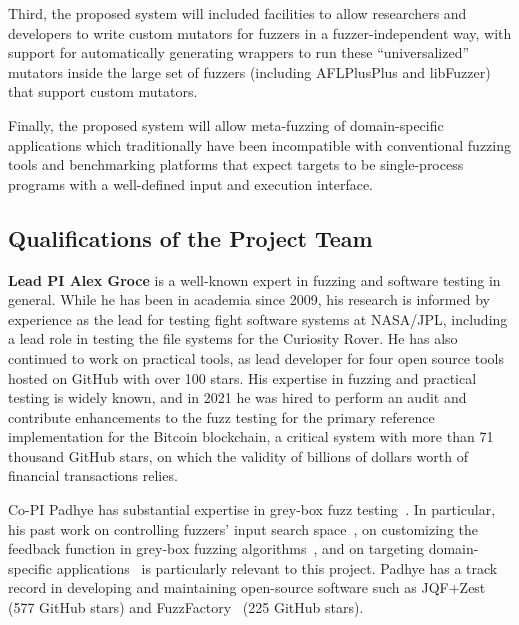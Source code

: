 Third, the proposed system will included facilities to allow researchers and developers to 
write custom mutators for fuzzers in a fuzzer-independent way, with support for 
automatically generating wrappers to run these ``universalized'' mutators 
inside the large set of fuzzers (including AFLPlusPlus and libFuzzer) that 
support custom mutators.

Finally, the proposed system will allow meta-fuzzing of domain-specific applications
which traditionally have been incompatible with conventional fuzzing tools and
benchmarking platforms that expect targets to be single-process programs with
a well-defined input and execution interface.

\subsection{Qualifications of the Project Team}

{\bf Lead PI Alex Groce} is a well-known expert in fuzzing and software testing
in general. While he has been in academia since 2009, his research is informed
by experience as the lead for testing fight software systems at NASA/JPL,
including a lead role in testing the file systems for the Curiosity Rover. He
has also continued to work on practical tools, as lead developer for four open
source tools hosted on GitHub with over 100 stars. His expertise in fuzzing and
practical testing is widely known, and in 2021 he was hired to perform an audit
and contribute enhancements to the fuzz testing for the primary reference
implementation for the Bitcoin blockchain, a critical system with more than 71
thousand GitHub stars, on which the validity of billions of dollars worth of
financial transactions relies.

Co-PI Padhye has substantial expertise in grey-box fuzz testing~\cite{perffuzz,
jqf, zest, fuzzfactory, rlcheck, bigfuzz, bonsai, naturalfuzz, mu2}. In
particular, his past work on controlling fuzzers' input search space~\cite{jqf,
zest}, on customizing the feedback function in grey-box fuzzing
algorithms~\cite{perffuzz, fuzzfactory, bonsai, mu2}, and on targeting
domain-specific applications~\cite{partemu, bigfuzz, naturalfuzz} is
particularly relevant to this project. Padhye has a track record in developing
and maintaining open-source software such as JQF+Zest~\cite{jqf-github} (577
GitHub stars) and FuzzFactory~\cite{fuzzfactory} (225 GitHub stars).


